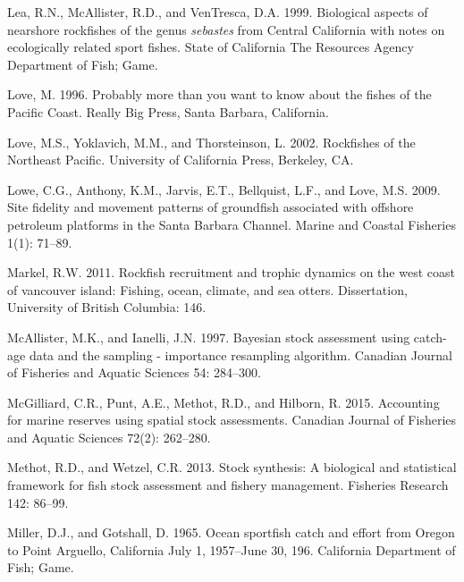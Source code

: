 \documentclass[11pt,
  english,
  a4paper,
]{article}
\newlength{\cslhangindent}
\newenvironment{CSLReferences}[2] %
 {%
  \setlength{\parindent}{0pt}
  \ifodd #1 \everypar{\setlength{\hangindent}{\cslhangindent}}\ignorespaces\fi
  \ifnum #2 > 0
  \setlength{\parskip}{#2\baselineskip}
  \fi
 }%
 {}
\begin{document}
\begin{CSLReferences}{1}{0}
\leavevmode{}%
Lea, R.N., McAllister, R.D., and VenTresca, D.A. 1999. Biological aspects of nearshore rockfishes of the genus \emph{sebastes} from {Central} {California} with notes on ecologically related sport fishes. State of California The Resources Agency Department of Fish; Game.

\leavevmode{}%
Love, M. 1996. Probably more than you want to know about the fishes of the {Pacific} {Coast}. Really Big Press, Santa Barbara, California.

\leavevmode{}%
Love, M.S., Yoklavich, M.M., and Thorsteinson, L. 2002. Rockfishes of the {Northeast} {Pacific}. University of California Press, Berkeley, CA.

\leavevmode{}%
Lowe, C.G., Anthony, K.M., Jarvis, E.T., Bellquist, L.F., and Love, M.S. 2009. Site fidelity and movement patterns of groundfish associated with offshore petroleum platforms in the {Santa} {Barbara} {Channel}. Marine and Coastal Fisheries 1(1): 71--89.

\leavevmode{}%
Markel, R.W. 2011. Rockfish recruitment and trophic dynamics on the west coast of vancouver island: Fishing, ocean, climate, and sea otters. Dissertation, University of British Columbia: 146.

\leavevmode{}%
McAllister, M.K., and Ianelli, J.N. 1997. Bayesian stock assessment using catch-age data and the sampling - importance resampling algorithm. Canadian Journal of Fisheries and Aquatic Sciences 54: 284--300.

\leavevmode{}%
McGilliard, C.R., Punt, A.E., Methot, R.D., and Hilborn, R. 2015. Accounting for marine reserves using spatial stock assessments. Canadian Journal of Fisheries and Aquatic Sciences 72(2): 262--280.

\leavevmode{}%
Methot, R.D., and Wetzel, C.R. 2013. Stock synthesis: A biological and statistical framework for fish stock assessment and fishery management. Fisheries Research 142: 86--99.

\leavevmode{}%
Miller, D.J., and Gotshall, D. 1965. Ocean sportfish catch and effort from {Oregon} to {Point} {Arguello}, {California} {July} 1, 1957--{June} 30, 196. California Department of Fish; Game.


\end{CSLReferences}
\end{document}
